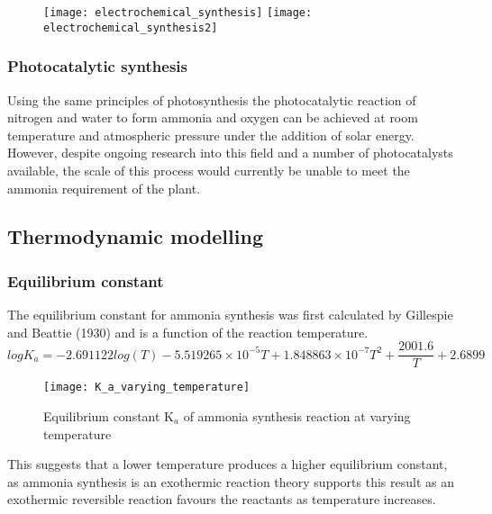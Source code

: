 {{\begin{figure}[h]
{			\texttt{[image: electrochemical\_synthesis]}
			\texttt{[image: electrochemical\_synthesis2]}	
	}
\end{figure}}



\subsubsection{Photocatalytic synthesis}
Using the same principles of photosynthesis the photocatalytic reaction of nitrogen and water to form ammonia and oxygen can be achieved at room temperature and atmospheric pressure under the addition of solar energy. However, despite ongoing research into this field and a number of photocatalysts available, the scale of this process would currently be unable to meet the ammonia requirement of the plant\cite{Liu2014}.


\subsection{Thermodynamic modelling}

\subsubsection{Equilibrium constant}

The equilibrium constant for ammonia synthesis was first calculated by Gillespie and Beattie (1930)\cite{Gillespie1930} and is a function of the reaction temperature.
\begin{equation}
logK_a = -2.691122log(T) - 5.519265\times10^{-5}T + 1.848863\times10^{-7}T^2+\frac{2001.6}{T}+2.6899
\end{equation}
{\begin{figure}[h]
\begin{center}

		\caption{Equilibrium constant K$_a$ of ammonia synthesis reaction at varying temperature}


\texttt{[image: K\_a\_varying\_temperature]}
\end{center}
\end{figure}}

This suggests that a lower temperature produces a higher equilibrium constant, as ammonia synthesis is an exothermic reaction theory supports this result as an exothermic reversible reaction favours the reactants as temperature increases.

}
